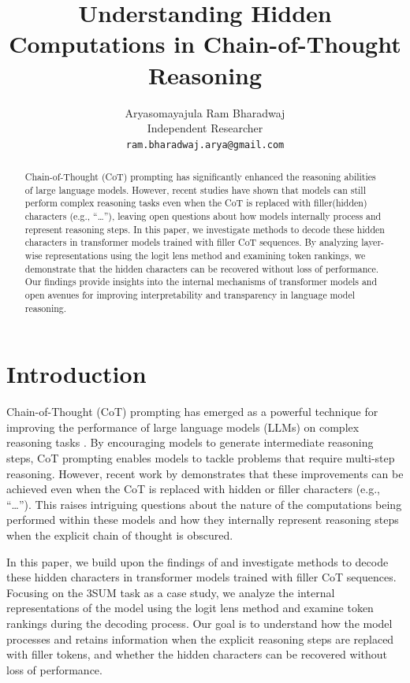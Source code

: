 \documentclass{article}
\title{Understanding Hidden Computations in Chain-of-Thought Reasoning}
\author{Aryasomayajula Ram Bharadwaj \\
Independent Researcher \\
\texttt{ram.bharadwaj.arya@gmail.com}}
\date{}
\begin{document}
\maketitle

\begin{abstract}
Chain-of-Thought (CoT) prompting has significantly enhanced the reasoning abilities of large language models. However, recent studies have shown that models can still perform complex reasoning tasks even when the CoT is replaced with filler(hidden) characters (e.g., ``\ldots''), leaving open questions about how models internally process and represent reasoning steps. In this paper, we investigate methods to decode these hidden characters in transformer models trained with filler CoT sequences. By analyzing layer-wise representations using the logit lens method and examining token rankings, we demonstrate that the hidden characters can be recovered without loss of performance. Our findings provide insights into the internal mechanisms of transformer models and open avenues for improving interpretability and transparency in language model reasoning.
\end{abstract}

\section{Introduction}

Chain-of-Thought (CoT) prompting has emerged as a powerful technique for improving the performance of large language models (LLMs) on complex reasoning tasks \cite{wei2022chain}. By encouraging models to generate intermediate reasoning steps, CoT prompting enables models to tackle problems that require multi-step reasoning. However, recent work by \cite{pfau2023let} demonstrates that these improvements can be achieved even when the CoT is replaced with hidden or filler characters (e.g., ``\ldots''). This raises intriguing questions about the nature of the computations being performed within these models and how they internally represent reasoning steps when the explicit chain of thought is obscured.

In this paper, we build upon the findings of \cite{pfau2023let} and investigate methods to decode these hidden characters in transformer models trained with filler CoT sequences. Focusing on the 3SUM task as a case study, we analyze the internal representations of the model using the logit lens method \cite{nostalgebraist2020} and examine token rankings during the decoding process. Our goal is to understand how the model processes and retains information when the explicit reasoning steps are replaced with filler tokens, and whether the hidden characters can be recovered without loss of performance.
\end{document}
